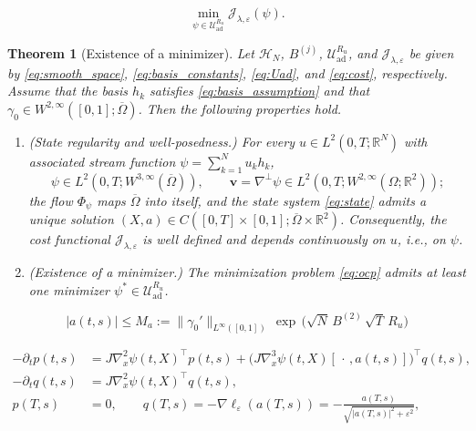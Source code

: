\documentclass[10pt,a4paper]{amsart}
\newtheorem{thm}{Theorem}
\begin{document}
\begin{equation}\label{eq:ocp}
\min_{\psi\in\mathcal{U}_{\mathrm{ad}}^{R_u}}\mathcal{J}_{\lambda,\varepsilon}(\psi).
\end{equation}

\begin{thm}[Existence of a minimizer]\label{prop:H3}
Let $\mathcal H_N$, $B^{(j)}$, $\mathcal U_{\mathrm{ad}}^{R_u}$, and $\mathcal J_{\lambda,\varepsilon}$ be given by \eqref{eq:smooth_space}, \eqref{eq:basis_constants}, \eqref{eq:Uad}, and \eqref{eq:cost}, respectively. Assume that the basis $h_k$ satisfies \eqref{eq:basis_assumption} and that $\gamma_0\in W^{2,\infty}([0,1];\overline\Omega)$. Then the following properties hold.
\begin{enumerate}
\item[\textup{(i)}]\emph{(State regularity and well-posedness.)} For every $u\in L^2(0,T;\mathbb R^N)$ with associated stream function $\psi=\sum_{k=1}^N u_k h_k$,
\begin{equation}\label{eq:v_reg}
\psi\in L^2(0,T;W^{3,\infty}(\overline\Omega)),\qquad
\mathbf v=\nabla^\perp\psi\in L^2(0,T;W^{2,\infty}(\Omega;\mathbb R^2));
\end{equation}
the flow $\Phi_\psi$ maps $\overline\Omega$ into itself, and the state system  \eqref{eq:state} admits a unique solution $(X,a)\in C([0,T]\times[0,1];\overline\Omega\times\mathbb R^2)$. Consequently, the cost functional $\mathcal{J}_{\lambda,\varepsilon}$ is well defined and depends continuously on $u$, i.e., on  $\psi$.
\item[\textup{(ii)}]\emph{(Existence of a minimizer.)} The minimization problem \eqref{eq:ocp} admits at least one minimizer $\psi^*\in\mathcal U_{\mathrm{ad}}^{R_u}$.
\end{enumerate}
\end{thm}

\begin{equation}\label{eq:Ma}
|a(t,s)|\le M_a:=\|\gamma_0'\|_{L^\infty([0,1])}\,\exp\,\bigl(\sqrt N\,B^{(2)}\,\sqrt T\,R_u\bigr)
\end{equation}

\begin{align}
-\partial_t p(t,s)
&=J\nabla_x^2\psi(t,X)^\top p(t,s)+\bigl(J\nabla_x^3\psi(t,X)[\,\cdot\,,a(t,s)]\bigr)^{\!\top}\!q(t,s),\label{eq:adjoint_p}\\
-\partial_t q(t,s)
&=J\nabla_x^2\psi(t,X)^\top q(t,s),\label{eq:adjoint_q}\\
p(T,s)&=0,\qquad
q(T,s)=-\nabla\ell_\varepsilon(a(T,s))=-\frac{a(T,s)}{\sqrt{|a(T,s)|^2+\varepsilon^2}},\label{eq:adjoint_tc}
\end{align}
\end{document}
